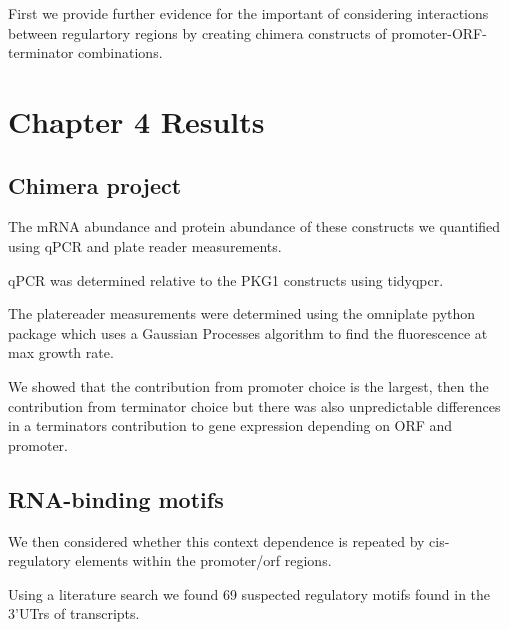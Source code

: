 \documentclass{SBCbookchapter}
\begin{document}
 First we provide further evidence for the important of considering interactions between regulartory regions by creating chimera constructs of promoter-ORF-terminator combinations.
 
\section{Chapter 4 Results}

\subsection{Chimera project}

The mRNA abundance and protein abundance of these constructs we quantified using qPCR and plate reader measurements.

qPCR was determined relative to the PKG1 constructs using tidyqpcr.

The platereader measurements were determined using the omniplate python package which uses a Gaussian Processes algorithm to find the fluorescence at max growth rate.

We showed that the contribution from promoter choice is the largest, then the contribution from terminator choice but there was also unpredictable differences in a terminators contribution to gene expression depending on ORF and promoter.

\subsection{RNA-binding motifs}

We then considered whether this context dependence is repeated by cis-regulatory elements within the promoter/orf regions.

Using a literature search we found 69 suspected regulatory motifs found in the 3'UTrs of transcripts.
\end{document}
